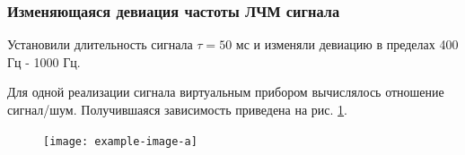 \subsubsection{Изменяющаяся девиация частоты ЛЧМ сигнала}%
\label{ssub:izmeniaiushchaiasia_deviatsiia_chastoty_signala}
Установили длительность сигнала $\tau=50$ мс и изменяли девиацию в пределах
400 Гц - 1000 Гц.

Для одной реализации сигнала виртуальным прибором
вычислялось отношение сигнал/шум. Получившаяся зависимость приведена на рис.
\ref{fig:4.3}.

\begin{figure}[h!]
    \centering
    \texttt{[image: example-image-a]}
    \label{fig:4.3}
\end{figure}









